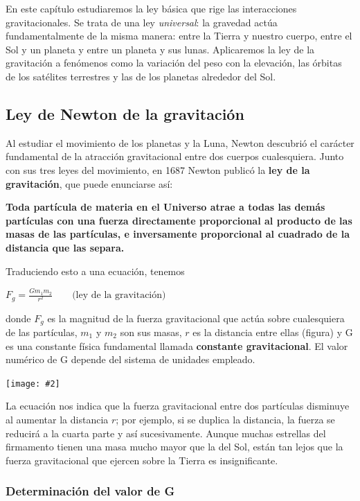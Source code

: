 \documentclass{article}
\newcommand{\newsubsection}[1]{
    \vspace{0.5cm}
    \color{sectionColor}
    \subsection{\bl{#1}}
    \color{black}
    \vspace{0.5cm}
}
\newcommand{\newtitle}[1]{
    \color{titleColor}
    \subsubsection{#1}
    \color{black}
}
\newcommand{\bl}[1]{\textbf{#1}}
\newcommand{\definicion}[1]{%
    \vspace{0.5cm}
    \begin{definicionbox}
        #1
    \end{definicionbox}
    \vspace{0.5cm}
}
\newcommand{\ladoALado}[4]{
    \begin{minipage}[t]{#3\textwidth}
        \vspace{0pt}
        #1
    \end{minipage}
    \hfill
    \begin{minipage}[t]{#4\textwidth}
        \vspace{0pt}
        \centering
        \texttt{[image: \#2]}
    \end{minipage}
}
\begin{document}
    \par En este capítulo estudiaremos la ley básica que rige las interacciones gravitacionales. Se trata de una ley \textit{universal}: la gravedad actúa fundamentalmente de la misma manera: entre la Tierra y nuestro cuerpo, entre el Sol y un planeta y entre un planeta y sus lunas. Aplicaremos la ley de la gravitación a fenómenos como la variación del peso con la elevación, las órbitas de los satélites terrestres y las de los planetas alrededor del Sol.

    \newsubsection{Ley de Newton de la gravitación}

    \par Al estudiar el movimiento de los planetas y la Luna, Newton descubrió el carácter fundamental de la atracción gravitacional entre dos cuerpos cualesquiera. Junto con sus tres leyes del movimiento, en 1687 Newton publicó la \bl{ley de la gravitación}, que puede enunciarse así:

    \definicion{
        \bl{
            Toda partícula de materia en el Universo atrae a todas las demás partículas con una fuerza directamente proporcional al producto de las masas de las partículas, e inversamente proporcional al cuadrado de la distancia que las separa.
        }
    }

    \par Traduciendo esto a una ecuación, tenemos

    \definicion{
        \centering
        \( F_g = \frac{G m_1 m_2}{r^2} \quad \quad \text{(ley de la gravitación)} \)
    }

    \ladoALado{
        \noindent donde $F_g$ es la magnitud de la fuerza gravitacional que actúa sobre cualesquiera de las partículas, $m_1$ y $m_2$ son sus masas, $r$ es la distancia entre ellas (ﬁgura) y G es una constante física fundamental llamada \bl{constante gravitacional}. El valor numérico de G depende del sistema de unidades empleado.
    }{img/11.1-1.png}{0.5}{0.5}

    \par La ecuación nos indica que la fuerza gravitacional entre dos partículas disminuye al aumentar la distancia $r$; por ejemplo, si se duplica la distancia, la fuerza se reducirá a la cuarta parte y así sucesivamente. Aunque muchas estrellas del ﬁrmamento tienen una masa mucho mayor que la del Sol, están tan lejos que la fuerza gravitacional que ejercen sobre la Tierra es insigniﬁcante.

    \newtitle{Determinación del valor de G}
\end{document}
